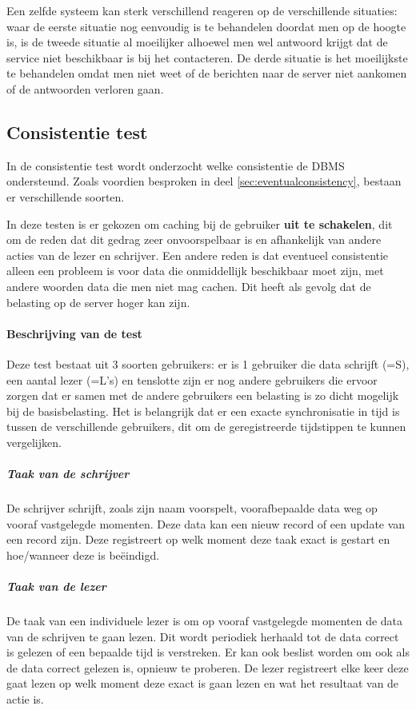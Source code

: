 Een zelfde systeem kan sterk verschillend reageren op de verschillende situaties: waar de eerste situatie nog eenvoudig is te behandelen doordat men op de hoogte is, is de tweede situatie al moeilijker alhoewel men wel antwoord krijgt dat de service niet beschikbaar is bij het contacteren. De derde situatie is het moeilijkste te behandelen omdat men niet weet of de berichten naar de server niet aankomen of de antwoorden verloren gaan. 
 
\subsection{Consistentie test}
In de consistentie test wordt onderzocht welke consistentie de DBMS ondersteund. Zoals voordien besproken in deel \ref{sec:eventualconsistency}, bestaan er verschillende soorten. 

In deze testen is er gekozen om caching bij de gebruiker \textbf{uit te schakelen}, dit om de reden dat dit gedrag zeer onvoorspelbaar is en afhankelijk van andere acties van de lezer en schrijver. Een andere reden is dat eventueel consistentie alleen een probleem is voor data die onmiddellijk beschikbaar moet zijn, met andere woorden data die men niet mag cachen. Dit heeft als gevolg dat de belasting op de server hoger kan zijn. 

\paragraph{Beschrijving van de test} Deze test bestaat uit 3 soorten gebruikers: er is 1 gebruiker die data schrijft (=S), een aantal lezer (=L's) en tenslotte zijn er nog andere gebruikers die ervoor zorgen dat er samen met de andere gebruikers een belasting is zo dicht mogelijk bij de basisbelasting. 
Het is belangrijk dat er een exacte synchronisatie in tijd is tussen de verschillende gebruikers, dit om de geregistreerde tijdstippen te kunnen vergelijken.

\subparagraph{Taak van de schrijver} De schrijver schrijft, zoals zijn naam voorspelt, voorafbepaalde data weg op vooraf vastgelegde momenten. Deze data kan een nieuw record of een update van een record zijn. Deze registreert op welk moment deze taak exact is gestart en hoe/wanneer deze is beëindigd.

\subparagraph{Taak van de lezer} De taak van een individuele lezer is om op vooraf vastgelegde momenten de data van de schrijven te gaan lezen. Dit wordt periodiek herhaald tot de data correct is gelezen of een bepaalde tijd is verstreken. Er kan ook beslist worden om ook als de data correct gelezen is, opnieuw te proberen. De lezer registreert elke keer deze gaat lezen op welk moment deze exact is gaan lezen en wat het resultaat van de actie is.  

